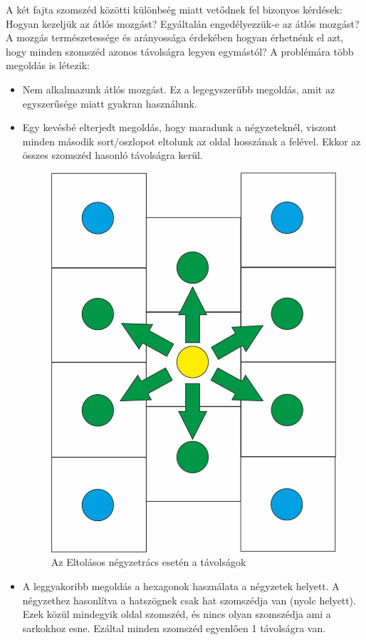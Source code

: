 \noindent A két fajta szomszéd közötti különbség miatt vetődnek fel bizonyos kérdések: Hogyan kezeljük az átlós mozgást? Egyáltalán engedélyezzük-e az átlós mozgást? A mozgás természetessége és arányossága érdekében hogyan érhetnénk el azt, hogy minden szomszéd azonos távolságra legyen egymástól?
\newline
\newline A problémára több megoldás is létezik:

\begin{itemize}
\item Nem alkalmazunk átlós mozgást. Ez a legegyszerűbb megoldás, amit az egyszerűsége miatt gyakran használunk.
\item Egy kevésbé elterjedt megoldás, hogy maradunk a négyzeteknél, viszont minden második sort/oszlopot eltolunk az oldal hosszának a felével. Ekkor az összes szomszéd hasonló távolságra kerül.

\begin{figure}[h!]
\centering
\includegraphics[scale=0.3]{kepek/SqOffsetDistance.jpg}
\caption{Az Eltolásos négyzetrács esetén a távolságok}
\label{fig:SqOffsetDistance}
\end{figure}

\item A leggyakoribb megoldás a hexagonok használata a négyzetek helyett. A négyzethez hasonlítva a hatszögnek csak hat szomszédja van (nyolc helyett). Ezek közül mindegyik oldal szomszéd, és nincs olyan szomszédja ami a sarkokhoz esne. Ezáltal minden szomszéd egyenlően 1 távolságra van.
\end{itemize}

